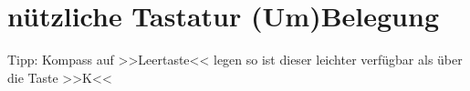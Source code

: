 \section{nützliche Tastatur (Um)Belegung}
Tipp: Kompass auf >>Leertaste<< legen so ist dieser leichter verfügbar als über die Taste >>K<<
